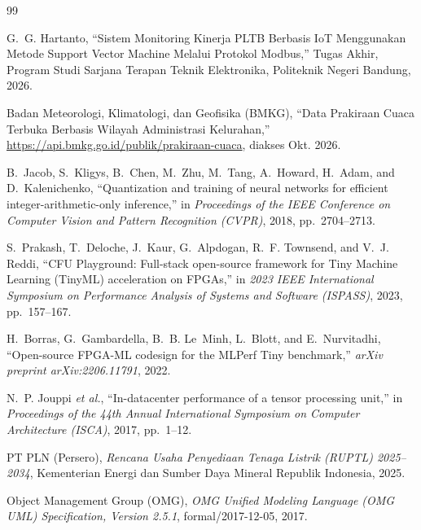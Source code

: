 \documentclass[12pt,a4paper]{article}
\begin{document}
\newpage
\begin{thebibliography}{99}

G.~G. Hartanto, ``Sistem Monitoring Kinerja PLTB Berbasis IoT Menggunakan Metode Support Vector Machine Melalui Protokol Modbus,'' Tugas Akhir, Program Studi Sarjana Terapan Teknik Elektronika, Politeknik Negeri Bandung, 2026.

Badan Meteorologi, Klimatologi, dan Geofisika (BMKG), ``Data Prakiraan Cuaca Terbuka Berbasis Wilayah Administrasi Kelurahan,'' \url{https://api.bmkg.go.id/publik/prakiraan-cuaca}, diakses Okt. 2026.

B.~Jacob, S.~Kligys, B.~Chen, M.~Zhu, M.~Tang, A.~Howard, H.~Adam, and D.~Kalenichenko, ``Quantization and training of neural networks for efficient integer-arithmetic-only inference,'' in \emph{Proceedings of the IEEE Conference on Computer Vision and Pattern Recognition (CVPR)}, 2018, pp.~2704--2713.

S.~Prakash, T.~Deloche, J.~Kaur, G.~Alpdogan, R.~F. Townsend, and V.~J. Reddi, ``CFU Playground: Full-stack open-source framework for Tiny Machine Learning (TinyML) acceleration on FPGAs,'' in \emph{2023 IEEE International Symposium on Performance Analysis of Systems and Software (ISPASS)}, 2023, pp.~157--167.

H.~Borras, G.~Gambardella, B.~B. Le~Minh, L.~Blott, and E.~Nurvitadhi, ``Open-source FPGA-ML codesign for the MLPerf Tiny benchmark,'' \emph{arXiv preprint arXiv:2206.11791}, 2022.

N.~P. Jouppi \emph{et al.}, ``In-datacenter performance of a tensor processing unit,'' in \emph{Proceedings of the 44th Annual International Symposium on Computer Architecture (ISCA)}, 2017, pp.~1--12.

PT PLN (Persero), \emph{Rencana Usaha Penyediaan Tenaga Listrik (RUPTL) 2025--2034}, Kementerian Energi dan Sumber Daya Mineral Republik Indonesia, 2025.

Object Management Group (OMG), \emph{OMG Unified Modeling Language (OMG UML) Specification, Version 2.5.1}, formal/2017-12-05, 2017.

\end{thebibliography}
\end{document}
